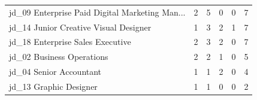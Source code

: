 \begin{tabular}{@{}lccccc@{}}
jd\_09 Enterprise Paid Digital Marketing Man... & \cellcolor{blue!12}2 & \cellcolor{blue!30}5 & \cellcolor{blue!0}0 & \cellcolor{blue!0}0 & 7 \\
jd\_14 Junior Creative Visual Designer & \cellcolor{blue!6}1 & \cellcolor{blue!18}3 & \cellcolor{blue!12}2 & \cellcolor{blue!6}1 & 7 \\
jd\_18 Enterprise Sales Executive & \cellcolor{blue!12}2 & \cellcolor{blue!18}3 & \cellcolor{blue!12}2 & \cellcolor{blue!0}0 & 7 \\
jd\_02 Business Operations & \cellcolor{blue!12}2 & \cellcolor{blue!12}2 & \cellcolor{blue!6}1 & \cellcolor{blue!0}0 & 5 \\
jd\_04 Senior Accountant & \cellcolor{blue!6}1 & \cellcolor{blue!6}1 & \cellcolor{blue!12}2 & \cellcolor{blue!0}0 & 4 \\
jd\_13 Graphic Designer & \cellcolor{blue!6}1 & \cellcolor{blue!6}1 & \cellcolor{blue!0}0 & \cellcolor{blue!0}0 & 2 \\
\bottomrule
\end{tabular}
